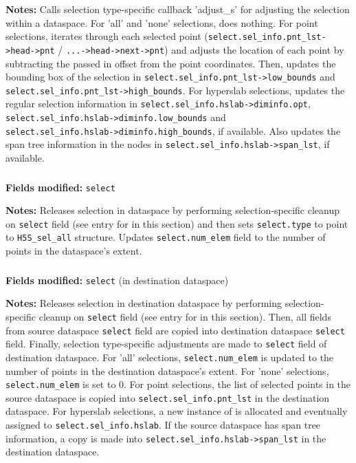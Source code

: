 \documentclass[../HDF5_RFC.tex]{subfiles}
\begin{document}
\textbf{Notes:} Calls selection type-specific callback 'adjust\_s' for adjusting the selection within
a dataspace. For 'all' and 'none' selections, does nothing. For point selections, iterates through each
selected point (\texttt{select.sel\_info.pnt\_lst->head->pnt} / \texttt{...->head->next->pnt}) and adjusts
the location of each point by subtracting the passed in offset from the point coordinates. Then, updates
the bounding box of the selection in \texttt{select.sel\_info.pnt\_lst->low\_bounds} and \\
\texttt{select.sel\_info.pnt\_lst->high\_bounds}. For hyperslab selections, updates the regular selection
information in \texttt{select.sel\_info.hslab->diminfo.opt}, \\
\texttt{select.sel\_info.hslab->diminfo.low\_bounds} and \\
\texttt{select.sel\_info.hslab->diminfo.high\_bounds}, if available. Also updates the span tree information
in the nodes in \texttt{select.sel\_info.hslab->span\_lst}, if available.

\subsubsection{}

\textbf{Fields modified:} \texttt{select}

\textbf{Notes:} Releases selection in dataspace by performing selection-specific cleanup on
\texttt{select} field (see entry for  in this section) and then
sets \texttt{select.type} to point to \texttt{H5S\_sel\_all} structure. Updates \texttt{select.num\_elem}
field to the number of points in the dataspace's extent.

\subsubsection{}

\textbf{Fields modified:} \texttt{select} (in destination dataspace)

\textbf{Notes:} Releases selection in destination dataspace by performing selection-specific cleanup
on \texttt{select} field (see entry for  in this section). Then, all
fields from source dataspace \texttt{select} field are copied into destination dataspace \texttt{select}
field. Finally, selection type-specific adjustments are made to \texttt{select} field of destination
dataspace. For 'all' selections, \texttt{select.num\_elem} is updated to the number of points in the
destination dataspace's extent. For 'none' selections, \texttt{select.num\_elem} is set to 0. For
point selections, the list of selected points in the source dataspace is copied into
\texttt{select.sel\_info.pnt\_lst} in the destination dataspace. For hyperslab selections, a new
instance of  is allocated and eventually assigned to
\texttt{select.sel\_info.hslab}. If the source dataspace has span tree information, a copy is made
into \texttt{select.sel\_info.hslab->span\_lst} in the destination dataspace.
\end{document}
